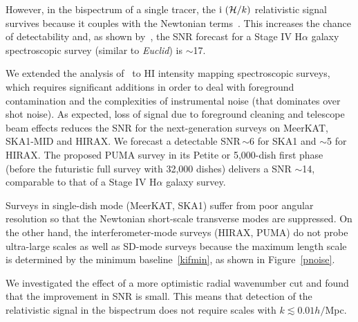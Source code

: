 However, in the bispectrum of a single tracer, the $\mathrm{i\,} \left(\mathcal{H}/k\right)$ relativistic signal survives because it couples with the Newtonian terms~\cite{Clarkson:2018dwn}. This increases the chance of detectability and, as shown by~\cite{Maartens:2019yhx}, the SNR forecast for a Stage IV H$\alpha$ galaxy spectroscopic survey  (similar to {\em Euclid}) is $\sim$17. 

We extended the analysis of~\cite{Maartens:2019yhx} to HI intensity mapping spectroscopic surveys, which requires significant additions in order to deal with foreground contamination and the complexities of instrumental noise (that dominates over shot noise). As expected, loss of signal due to foreground cleaning and telescope beam effects reduces the SNR for the next-generation surveys on MeerKAT, SKA1-MID and HIRAX. 
We forecast a detectable SNR\,$\sim$6 for SKA1 and $\sim$5 for HIRAX.
The proposed PUMA survey in its Petite or 5,000-dish first phase (before the futuristic full survey with 32,000 dishes) delivers a SNR $\sim$14, comparable to that  of a Stage IV H$\alpha$ galaxy survey.

Surveys in single-dish mode (MeerKAT, SKA1) suffer from poor angular resolution so that the Newtonian short-scale transverse modes are suppressed.  On the other hand, the interferometer-mode surveys (HIRAX, PUMA) do not probe ultra-large scales as well as SD-mode surveys because the maximum length scale is determined  by the minimum baseline~\eqref{kifmin}, as shown in Figure~\ref{pnoise}.

We investigated the effect of a more optimistic radial wavenumber cut and found that the improvement in SNR is small. This means that detection of the relativistic signal in the bispectrum does not require scales with $k\lesssim 0.01h/$Mpc. 

